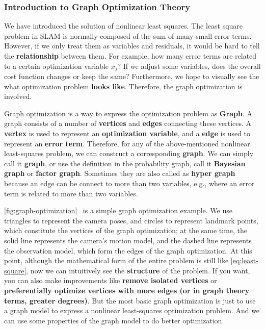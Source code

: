 \subsubsection{Introduction to Graph Optimization Theory}
We have introduced the solution of nonlinear least squares. The least square problem in SLAM is normally composed of the sum of many small error terms. However, if we only treat them as variables and residuals, it would be hard to tell the \textbf{relationship} between them. For example, how many error terms are related to a certain optimization variable $x_j$? If we adjust some variables, does the overall cost function changes or keep the same? Furthermore, we hope to visually see the what optimization problem \textbf{looks like}. Therefore, the graph optimization is involved.

Graph optimization is a way to express the optimization problem as \textbf{Graph}.  A graph consists of a number of \textbf{vertices} and \textbf{edges} connecting these vertices. A  \textbf{vertex} is used to represent an \textbf{optimization variable}, and a \textbf{edge} is used to represent an \textbf{error term}. Therefore, for any of the above-mentioned nonlinear least-squares problem, we can construct a corresponding \textbf{graph}. We can simply call it \textbf{graph}, or use the definition in the probability graph, call it \textbf{Bayesian graph} or \textbf{factor graph}. Sometimes they are also called as \textbf{hyper graph} because an edge can be connect to more than two variables, e.g., where an error term is related to more than two variables.

\autoref{fig:graph-optimization}~ is a simple graph optimization example. We use triangles to represent the camera poses, and circles to represent landmark points, which constitute the vertices of the graph optimization; at the same time, the solid line represents the camera's motion model, and the dashed line represents the observation model, which form the edges of the graph optimization. At this point, although the mathematical form of the entire problem is still like \eqref{eq:least-square}, now we can intuitively see the \textbf{structure} of the problem. If you want, you can also make improvements like \textbf{remove isolated vertices} or \textbf{preferentially optimize vertices with more edges (or in graph theory terms, greater degrees)}. But the most basic graph optimization is just to use a graph model to express a nonlinear least-squares optimization problem. And we can use some properties of the graph model to do better optimization.

